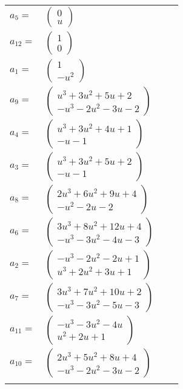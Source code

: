 \documentclass[1p]{elsarticle_modified}
\theoremstyle{definition}
\begin{document}
\begin{tabular}{m{7pt} m{180pt} m{7pt} m{180pt} }
\flushright $a_{5}=$&$\begin{pmatrix}0\\u\end{pmatrix}$ \\
\flushright $a_{12}=$&$\begin{pmatrix}1\\0\end{pmatrix}$ \\
\flushright $a_{1}=$&$\begin{pmatrix}1\\- u^2\end{pmatrix}$ \\
\flushright $a_{9}=$&$\begin{pmatrix}u^3+3 u^2+5 u+2\\- u^3-2 u^2-3 u-2\end{pmatrix}$ \\
\flushright $a_{4}=$&$\begin{pmatrix}u^3+3 u^2+4 u+1\\- u-1\end{pmatrix}$ \\
\flushright $a_{3}=$&$\begin{pmatrix}u^3+3 u^2+5 u+2\\- u-1\end{pmatrix}$ \\
\flushright $a_{8}=$&$\begin{pmatrix}2 u^3+6 u^2+9 u+4\\- u^2-2 u-2\end{pmatrix}$ \\
\flushright $a_{6}=$&$\begin{pmatrix}3 u^3+8 u^2+12 u+4\\- u^3-3 u^2-4 u-3\end{pmatrix}$ \\
\flushright $a_{2}=$&$\begin{pmatrix}- u^3-2 u^2-2 u+1\\u^3+2 u^2+3 u+1\end{pmatrix}$ \\
\flushright $a_{7}=$&$\begin{pmatrix}3 u^3+7 u^2+10 u+2\\- u^3-3 u^2-5 u-3\end{pmatrix}$ \\
\flushright $a_{11}=$&$\begin{pmatrix}- u^3-3 u^2-4 u\\u^2+2 u+1\end{pmatrix}$ \\
\flushright $a_{10}=$&$\begin{pmatrix}2 u^3+5 u^2+8 u+4\\- u^3-2 u^2-3 u-2\end{pmatrix}$\\&\end{tabular}
\end{document}
